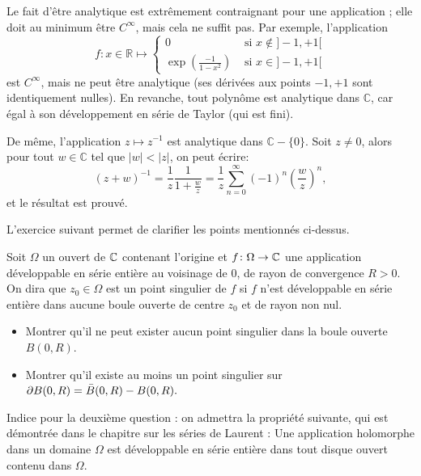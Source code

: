 Le fait d'être analytique est extrêmement contraignant pour une application ; elle doit au minimum être $C^\infty$, mais cela ne suffit pas. Par exemple, l'application
\[f \colon x \in \mathbb{R} \mapsto \left\{
\begin{array}{cc}
0 & \text{ si } x \notin ]-1,+1[ \\
\exp\left(\frac{-1}{1-x^2}\right) &  \text{ si } x \in ]-1,+1[
\end{array}
\right.
\]
est $C^\infty$, mais ne peut être analytique (ses dérivées aux points $-1,+1$
sont identiquement nulles).
En revanche, tout polynôme est analytique dans $\mathbb{C}$, car égal à son
développement en série de Taylor (qui est fini). 

De même, l'application $z
\mapsto z^{-1}$ est analytique dans $\mathbb{C}-\{0\}$. Soit $z \neq 0$, alors pour
tout $w \in \mathbb{C}$ tel que $|w|<|z|$, on peut écrire:
\[(z+w)^{-1}=  \frac{1}{z}\frac{1}{1+\frac{w}{z}} = \frac{1}{z} \sum_{n=0}^\infty (-1)^n \left( \frac{w}{z} \right)^n,\]
et le résultat est prouvé. 


L'exercice suivant permet de clarifier les points mentionnés ci-dessus.
\begin{exercice}
    Soit $\Omega$ un ouvert de $\mathbb{C}$ contenant l'origine et $f \colon \Omega \to \mathbb{C}$ une application développable en
    série entière au voisinage de $0$, de rayon de convergence $R > 0$. On dira que $z_0 \in \Omega$ est un point singulier de $f$ si $f$ n'est développable en série entière dans aucune boule ouverte de centre $z_0$ et de rayon non nul.
    \begin{itemize}
        \item Montrer qu'il ne peut exister aucun point singulier dans la boule ouverte $B(0,R).$
        \item Montrer qu'il existe au moins un point singulier sur $\partial B(0,R) = \Bar{B}(0,R)-B(0,R).$ 
    \end{itemize}
    Indice pour la deuxième question : on admettra la propriété suivante, qui est démontrée dans le chapitre sur les séries de Laurent : Une application holomorphe dans un domaine $\Omega$ est développable en série entière dans tout disque ouvert contenu dans $\Omega.$ 
     
\end{exercice}

